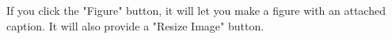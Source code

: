 If you click the "Figure" button, it will let you make a figure with an attached caption.  It will also provide a "Resize Image" button.